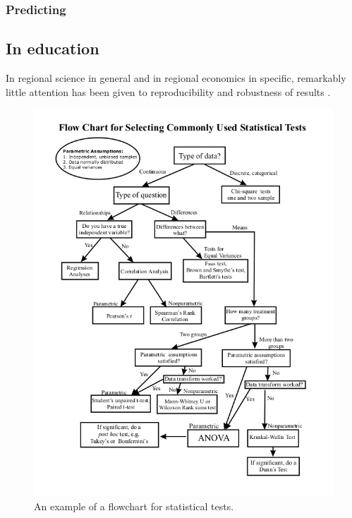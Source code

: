 \documentclass[fleqn,10pt]{SelfArx} %
\begin{document}
\subsubsection{Predicting}


\subsection{In education}

In regional science in general and in regional economics in specific, remarkably little attention has been given to reproducibility and robustness of results \citep[with some exceptions as, amongst some others, by][]{Rey:2014cl,arribas2015woow, Arribas2016}.

\begin{figure}[t!]\centering 
  \includegraphics[width=\columnwidth]{./figures/flowchart.jpg}
  \caption{An example of a flowchart for statistical tests.}
	\label{fig:flowchart}
\end{figure}
\end{document}
